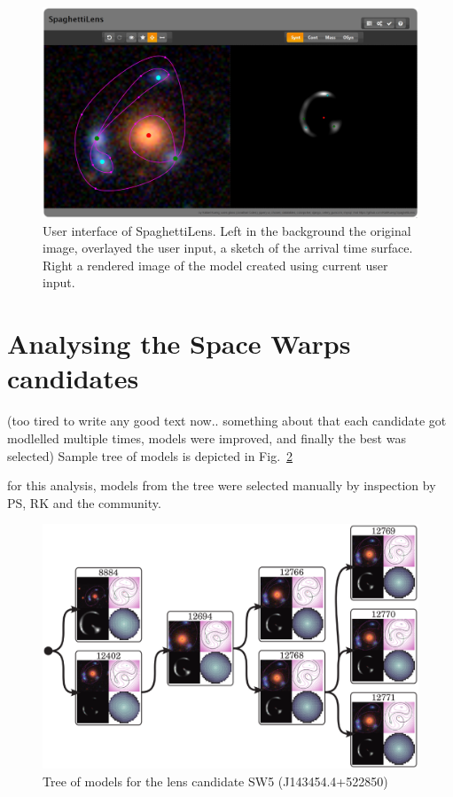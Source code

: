 \documentclass{ws-procs975x65}
\newcommand{\spl}{SpaghettiLens\xspace}
\newcommand{\sw}{Space Warps\xspace}
\newcommand{\figref}[1]{Fig.~\ref{fig:#1}}
\begin{document}
\begin{figure}
  \centering
  \includegraphics[width=\columnwidth]{screenshot_new}
  \caption{
    User interface of \spl. Left in the background the original image, overlayed the user input, a sketch of the arrival time surface. Right a rendered image of the model created using current user input.
  }
  \label{fig:ui}
\end{figure}


\section{Analysing the \sw candidates}

(too tired to write any good text now..
something about that each candidate got modlelled multiple times, models were improved, and finally the best was selected) Sample tree of models is depicted in \figref{tree}

for this analysis, models from the tree were selected manually by inspection by PS, RK and the community.

\begin{figure}
  \centering
  \includegraphics[width=\columnwidth]{modeltree}
  \caption{
    Tree of models for the lens candidate SW5 (J143454.4+522850)
  }
  \label{fig:tree}
\end{figure}
\end{document}
